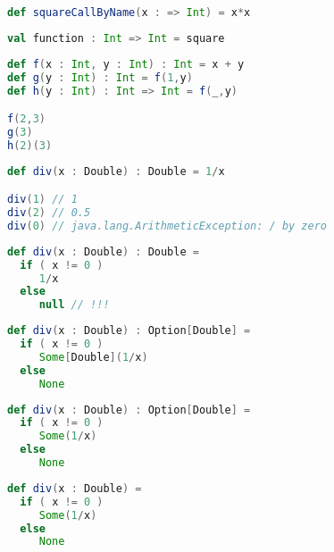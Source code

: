 \documentclass[10pt]{beamer}
\begin{document}
{\begin{frame}[fragile]
\begin{lstlisting}[language=Scala, basicstyle=\ttfamily]
def squareCallByName(x : => Int) = x*x
\end{lstlisting}
\end{frame}


\begin{frame}[fragile]
\begin{lstlisting}[language=Scala, basicstyle=\ttfamily]
val function : Int => Int = square
\end{lstlisting}
\end{frame}

\begin{frame}[fragile]
\begin{lstlisting}[language=Scala, basicstyle=\ttfamily]
def f(x : Int, y : Int) : Int = x + y
def g(y : Int) : Int = f(1,y)
def h(y : Int) : Int => Int = f(_,y)

f(2,3)
g(3)
h(2)(3)
\end{lstlisting}
\end{frame}

}

\begin{frame}[fragile]
\begin{lstlisting}[language=Scala, basicstyle=\ttfamily]
def div(x : Double) : Double = 1/x

div(1) // 1 
div(2) // 0.5 
div(0) // java.lang.ArithmeticException: / by zero
\end{lstlisting}
\end{frame}


\begin{frame}[fragile]
\begin{lstlisting}[language=Scala, basicstyle=\ttfamily]
def div(x : Double) : Double = 
  if ( x != 0 ) 
     1/x 
  else 
     null // !!!
\end{lstlisting}
\end{frame}

\begin{frame}[fragile]
\begin{lstlisting}[language=Scala, basicstyle=\ttfamily]
def div(x : Double) : Option[Double] =
  if ( x != 0 ) 
     Some[Double](1/x) 
  else 
     None
\end{lstlisting}
\end{frame}
\begin{frame}[fragile]
\begin{lstlisting}[language=Scala, basicstyle=\ttfamily]
def div(x : Double) : Option[Double] =
  if ( x != 0 ) 
     Some(1/x) 
  else 
     None
\end{lstlisting}
\end{frame}
\begin{frame}[fragile]
\begin{lstlisting}[language=Scala, basicstyle=\ttfamily]
def div(x : Double) = 
  if ( x != 0 ) 
     Some(1/x) 
  else 
     None
\end{lstlisting}
\end{frame}
\end{document}
